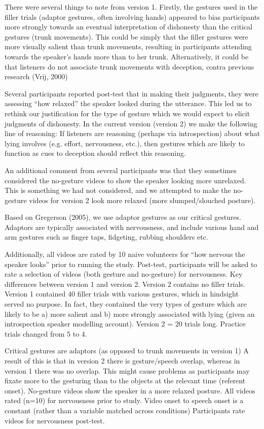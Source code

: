 \documentclass[a4paper,man,natbib]{apa6}
\begin{document}
There were several things to note from version 1. 
Firstly, the gestures used in the filler trials (adaptor gestures, often involving hands) appeared to bias participants more strongly towards an eventual interpretation of dishonesty than the critical gestures (trunk movements). 
This could be simply that the filler gestures were more visually salient than trunk movements, resulting in participants attending towards the speaker’s hands more than to her trunk.
Alternatively, it could be that listeners do not associate trunk movements with deception, contra previous research (Vrij, 2000)

Several participants reported post-test that in making their judgments, they were assessing “how relaxed” the speaker looked during the utterance. 
This led us to rethink our justification for the type of gesture which we would expect to elicit judgments of dishonesty. 
In the current version (version 2) we make the following line of reasoning: If listeners are reasoning (perhaps via introspection) about what lying involves (e.g. effort, nervousness, etc.), then gestures which are likely to function as cues to deception should reflect this  reasoning.

An additional comment from several participants was that they sometimes considered the no-gesture videos to show the speaker looking more unrelaxed.
This is something we had not considered, and we attempted to make the no-gesture videos for version 2 look more relaxed (more slumped/slouched posture).

Based on Gregerson (2005), we use adaptor gestures as our critical gestures. 
Adaptors are typically associated with nervousness, and include various hand and arm gestures such as finger taps, fidgeting, rubbing shoulders etc. 

Additionally, all videos are rated by 10 naive volunteers for “how nervous the speaker looks” prior to running the study.
Post-test, participants will be asked to rate a selection of videos (both gesture and no-gesture) for nervousness.
Key differences between version 1 and version 2.
Version 2 contains no filler trials.
Version 1 contained 40 filler trials with various gestures, which in hindsight served no purpose. In fact, they contained the very types of gesture which are likely to be a) more salient and b) more strongly associated with lying (given an introspection speaker modelling account).
Version 2 = 20 trials long. Practice trials changed from 5 to 4.

Critical gestures are adaptors (as opposed to trunk movements in version 1)
A result of this is that in version 2 there is gesture/speech overlap, whereas in version 1 there was no overlap. This might cause problems as participants may fixate more to the gesturing than to the objects at the relevant time (referent onset).
No-gesture videos show the speaker in a more relaxed posture.
All videos rated (n=10) for nervousness prior to study.
Video onset to speech onset is a constant (rather than a variable matched across conditions)
Participants rate videos for nervousness post-test.
\end{document}
